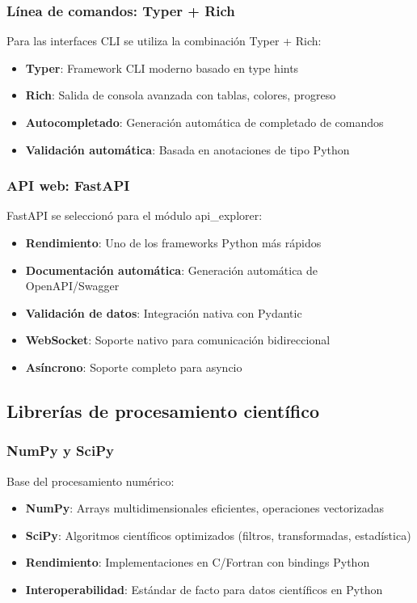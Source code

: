 \subsubsection{Línea de comandos: Typer + Rich}
Para las interfaces CLI se utiliza la combinación Typer + Rich:

\begin{itemize}
    \item \textbf{Typer}: Framework CLI moderno basado en type hints
    \item \textbf{Rich}: Salida de consola avanzada con tablas, colores, progreso
    \item \textbf{Autocompletado}: Generación automática de completado de comandos
    \item \textbf{Validación automática}: Basada en anotaciones de tipo Python
\end{itemize}

\subsubsection{API web: FastAPI}
FastAPI se seleccionó para el módulo api\_explorer:

\begin{itemize}
    \item \textbf{Rendimiento}: Uno de los frameworks Python más rápidos
    \item \textbf{Documentación automática}: Generación automática de OpenAPI/Swagger
    \item \textbf{Validación de datos}: Integración nativa con Pydantic
    \item \textbf{WebSocket}: Soporte nativo para comunicación bidireccional
    \item \textbf{Asíncrono}: Soporte completo para asyncio
\end{itemize}

\subsection{Librerías de procesamiento científico}
\label{subsec:librerias_cientifico}

\subsubsection{NumPy y SciPy}
Base del procesamiento numérico:

\begin{itemize}
    \item \textbf{NumPy}: Arrays multidimensionales eficientes, operaciones vectorizadas
    \item \textbf{SciPy}: Algoritmos científicos optimizados (filtros, transformadas, estadística)
    \item \textbf{Rendimiento}: Implementaciones en C/Fortran con bindings Python
    \item \textbf{Interoperabilidad}: Estándar de facto para datos científicos en Python
\end{itemize}

